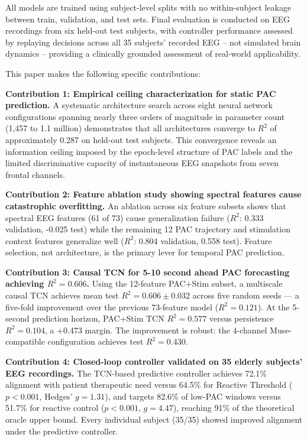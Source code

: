 \documentclass[11pt,letterpaper]{article}
\begin{document}
All models are trained using subject-level splits with no within-subject leakage between train, validation, and test sets. Final evaluation is conducted on EEG recordings from six held-out test subjects, with controller performance assessed by replaying decisions across all 35 subjects' recorded EEG -- not simulated brain dynamics -- providing a clinically grounded assessment of real-world applicability.

This paper makes the following specific contributions:

\textbf{Contribution 1: Empirical ceiling characterization for static PAC prediction.} A systematic architecture search across eight neural network configurations spanning nearly three orders of magnitude in parameter count (1,457 to 1.1 million) demonstrates that all architectures converge to $R^2$ of approximately 0.287 on held-out test subjects. This convergence reveals an information ceiling imposed by the epoch-level structure of PAC labels and the limited discriminative capacity of instantaneous EEG snapshots from seven frontal channels.

\textbf{Contribution 2: Feature ablation study showing spectral features cause catastrophic overfitting.} An ablation across six feature subsets shows that spectral EEG features (61 of 73) cause generalization failure ($R^2$: 0.333 validation, -0.025 test) while the remaining 12 PAC trajectory and stimulation context features generalize well ($R^2$: 0.804 validation, 0.558 test). Feature selection, not architecture, is the primary lever for temporal PAC prediction.

\textbf{Contribution 3: Causal TCN for 5-10 second ahead PAC forecasting achieving $R^2 = 0.606$.} Using the 12-feature PAC+Stim subset, a multiscale causal TCN achieves mean test $R^2 = 0.606 \pm 0.032$ across five random seeds --- a five-fold improvement over the previous 73-feature model ($R^2 = 0.121$). At the 5-second prediction horizon, PAC+Stim TCN $R^2 = 0.577$ versus persistence $R^2 = 0.104$, a +0.473 margin. The improvement is robust: the 4-channel Muse-compatible configuration achieves test $R^2 = 0.430$.

\textbf{Contribution 4: Closed-loop controller validated on 35 elderly subjects' EEG recordings.} The TCN-based predictive controller achieves 72.1\% alignment with patient therapeutic need versus 64.5\% for Reactive Threshold ($p < 0.001$, Hedges' $g = 1.31$), and targets 82.6\% of low-PAC windows versus 51.7\% for reactive control ($p < 0.001$, $g = 4.47$), reaching 91\% of the theoretical oracle upper bound. Every individual subject (35/35) showed improved alignment under the predictive controller.
\end{document}
